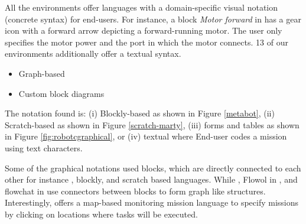  All the environments offer languages with a domain-specific visual notation (concrete syntax) for end-users. For instance, a block \emph{Motor forward} in \trik has a gear icon with a forward arrow depicting a forward-running motor. The user only specifies the motor power and the port in which the motor connects. 13 of our environments additionally offer a textual syntax.


\begin{itemize}
	\item Graph-based
	\item Custom block diagrams
\end{itemize}

The notation found is: (i) Blockly-based as shown in Figure \ref{metabot}, (ii) Scratch-based as shown in Figure
	\ref{scratch-marty}, (iii) forms and tables as shown in Figure \ref{fig:robotcgraphical}, or (iv) textual where End-user codes a mission using text characters.


Some of the graphical notations used blocks, which are directly connected to each other for instance \trik, blockly, and scratch based languages. While \choregraphe, Flowol in \robotmesh, and flowchat in \picaxe use connectors between blocks to form graph like structures. %
Interestingly, \flyaq offers a map-based 
monitoring mission language to specify missions by clicking on locations where tasks will be executed. 

